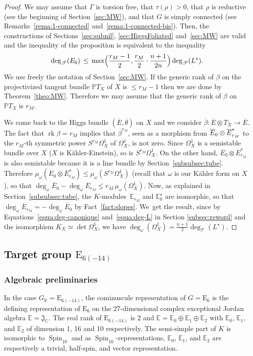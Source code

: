 \documentclass[10pt]{amsart}
\let\mathcal\mathscr
\theoremstyle{plain}
\theoremstyle{definition}
\let\ov\overline
\DeclareMathOperator{\rk}{rk}
\DeclareMathOperator{\Spin}{Spin}
\newcommand{\cT}{\mathcal{T}}
\newcommand{\bC}{\mathbb{C}}
\newcommand{\bE}{\mathbb{E}}
\newcommand{\bR}{\mathbb{R}}
\newcommand{\PTX}{{\mathbb{P}T_X}}
\newcommand{\fJ}{\mathfrak{J}}
\newcommand{\rkm}{{r_M}}
\newcommand{\ovE}{\ov{E}}
\newcommand{\ovb}{\ov{\beta}}
\newcommand{\ovt}{\ov{\theta}}
\let\Subsection\subsection\let\Subsubsection\subsubsection
\begin{document}
\begin{proof}
We may assume that $\Gamma$ is torsion free, that $\tau(\rho)>0$, that $\rho$
is reductive (see the beginning of Section~\ref{sec:MW}), and that $G$ is simply connected (see
Remarks~\ref{rema:1-connected} and~\ref{rema:1-connected-bis}). Then, the constructions of
Sections~\ref{sec:subnil}, \ref{sec:HiggsFoliated} and~\ref{sec:MW}
are valid and the inequality of the proposition is equivalent to the inequality
$$
\deg_\cT(E_0) \,\leq\,
\max\Bigl({\frac{\rkm-1}{2},\frac {\rkm}{2} \cdot \frac{n+1}{2n}} \Bigr) \deg_\cT(L^\star).
$$
We use freely the notation of Section~\ref{sec:MW}. If the generic rank of $\beta$ on the
projectivized tangent bundle $\PTX$
of $X$ is $\leq \rkm-1$ then we are done by Theorem~\ref{theo:MW}. Therefore we may assume that the
generic rank of $\beta$ on $\PTX$ is $\rkm$.

We come back to the Higgs bundle $(\ovE,\ovt)$ on $X$ and we consider \hbox{$\ovb:\ovE\otimes T_X\to\ovE$}. The fact that $\rk\beta=\rkm$ implies that $\ovb^\rkm$, seen as a morphism from
$\ovE_0\otimes\nobreak\ovE_\rkm^\star$ to the $\rkm$-th symmetric power $S^\rkm\Omega^1_X$ of $\Omega^1_X$, is not
zero. Since $\Omega^1_X$ is a semi\-stable bundle
over $X$ ($X$ is Kähler-Einstein), so is $S^\rkm\Omega^1_X$. On the other hand,
$\ovE_0\otimes\ovE_\rkm^\star$ is also semistable
because it is a line bundle by Section~\ref{subsubsec:tube}.
Therefore \hbox{$\mu_\omega(\ovE_0\otimes\ovE_\rkm^\star)\leq \mu_\omega(S^\rkm\Omega^1_X)$}
(recall that $\omega$ is our Kähler form on $X$),
so that $\deg_\omega \ovE_0-\deg_\omega \ovE_\rkm\leq \rkm\,\mu_\omega(\Omega^1_X)$. Now, as explained in
Section~\ref{subsubsec:tube}, the $K$\nobreakdash-mod\-ules~$\bE_\rkm$ and $\bE_0^\star$ are isomorphic, so that $\deg_\omega \ovE_\rkm=-\deg_\omega \ovE_0$
by Fact~\ref{fact:slopes}.
We~get the result, since by Equations~\eqref{equa:deg-canonique} and~\eqref{equa:deg-L}
in Section \ref{subsec:reword}
and the isomorphism $K_X \simeq \det \Omega^1_X$, we have
$\deg_\omega(\Omega^1_X)=\frac{n+1}{2}\deg_\cT(L^\star)$.
\end{proof}

\Subsection{Target group $\mathrm{E}_{6(-14)}$}\label{subsec:E6}

\subsubsection{Algebraic preliminaries}

In the case $G_\bR=\mathrm{E}_{6(-14)}$, the cominuscule
representation of $G=\mathrm{E}_6$ is the defining
representation of ${\mathrm{E}_6}$ on the 27-dimensional complex exceptional Jordan algebra $\bE=\fJ_\bC$.
The real rank of $\mathrm{E}_{6(-14)}$ is $2$ and $\bE=\bE_0\oplus\bE_1\oplus\bE_2$ with $\bE_0$, $\bE_1$,
and $\bE_2$ of dimension 1, 16 and 10 respectively. The semi-simple part of $K$ is isomorphic to
$\Spin_{10}$ and as $\Spin_{10}$-representations, $\bE_0$, $\bE_1$, and $\bE_2$ are respectively a
trivial, half-spin, and vector representation.
\end{document}
